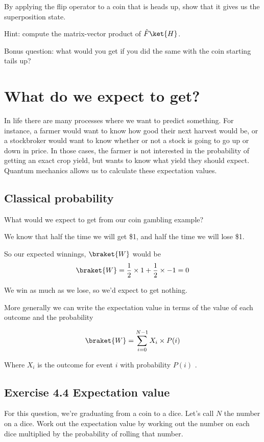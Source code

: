 \documentclass{book}
\begin{document}
By applying the flip operator to a coin that is heads up, show that it gives us the superposition state.  

Hint: compute the matrix-vector product of $\hat{F}\ket{H}$.   
  
Bonus question: what would you get if you did the same with the coin starting tails up?  



\section{What do we expect to get?}

In life there are many processes where we want to predict something. For instance, a farmer would want to know how good their next harvest would be, or a stockbroker would want to know whether or not a stock is going to go up or down in price. In those cases, the farmer is not interested in the probability of getting an exact crop yield, but wants to know what yield they should expect. Quantum mechanics allows us to calculate these expectation values.

\subsection{ Classical probability }

What would we expect to get from our coin gambling example? 

We know that half the time we will get \$1, and half the time we will lose \$1. 

So our expected winnings, $\braket{W}$ would be
$$
\braket{W} = \frac{1}{2} \times 1 + \frac{1}{2} \times -1 
=0
$$

We win as much as we lose, so we'd expect to get nothing. 

More generally we can write the expectation value in terms of the value of each outcome and the probability 

$$ \braket{W} = \sum_{i = 0}^{N-1} X_i \times P(i) $$

Where $X_i$ is the outcome for event $i$ with probability $P(i)$ . 

 
\subsection{Exercise 4.4 Expectation value}  
  
For this question, we're graduating from a coin to a dice. Let's call $N$ the number on a dice. Work out the expectation value by working out the number on each dice multiplied by the probability of rolling that number.
\end{document}
